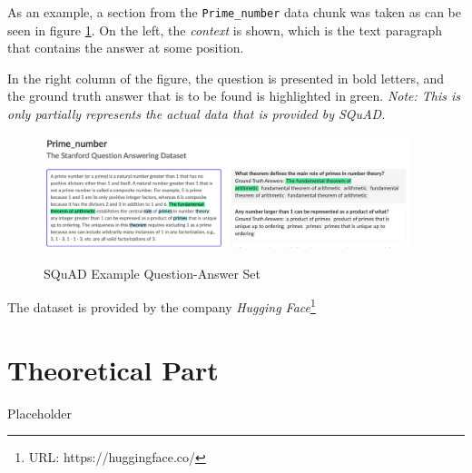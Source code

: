             As an example, a section from the \texttt{Prime\_number} data chunk was taken as can be seen in figure \ref{fig:-squad-example}. On the left, the \emph{context} is shown, which is the text paragraph that contains the answer at some position.

            In the right column of the figure, the question is presented in bold letters, and the ground truth answer that is to be found is highlighted in green. \emph{Note: This is only partially represents the actual data that is provided by SQuAD.}



            \begin{figure}[h!]
                \centering
                \caption{SQuAD Example Question-Answer Set\cite{squadExample}}
                \includegraphics[width=0.95\textwidth]{figures/squad_example.png}
                \label{fig:-squad-example}
            \end{figure}

            The dataset is provided by the company \emph{Hugging Face}\footnote{URL: https://huggingface.co/}
            

    \section{Theoretical Part}
    \label{sec:theoretical-part}

        Placeholder

